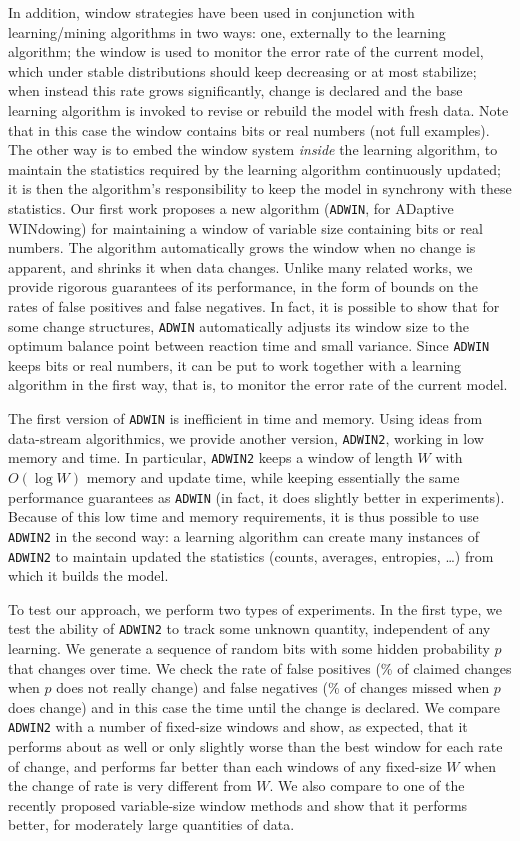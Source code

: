 In addition, window strategies have been used in conjunction
with learning/mining algorithms in two ways: one,
externally to the learning algorithm; the window is used
to monitor the error rate of the current model, which under
stable distributions should keep decreasing or at most stabilize;
when instead this rate grows significantly, change is declared and
the base learning algorithm is invoked to revise or rebuild the
model with fresh data. Note that in this case the window
contains bits or real numbers (not full examples).
The other way is to embed the window system {\em inside} the learning
algorithm, to maintain the statistics required by the learning
algorithm continuously updated; it is then the algorithm's responsibility
to keep the model in synchrony with these statistics. 
\ENDOMIT
Our first work \cite{bif-gav}
proposes a new algorithm ({\tt ADWIN}, for ADaptive
WINdowing) %
for maintaining a window of variable size containing bits or real numbers.
The algorithm automatically grows the window when no change is apparent,
and shrinks it when data changes.
Unlike many related works, we provide rigorous guarantees of
its performance, in the form of bounds on the rates of false positives
and false negatives.
In fact, it is possible to show that for some change structures, {\tt ADWIN}
automatically adjusts its window size to the optimum balance point
between reaction time and small variance.
Since {\tt ADWIN} keeps bits or real numbers, it can be put to work
together with a learning algorithm in the first way, that is,
to monitor the error rate of the current model.

The first version of {\tt ADWIN} is inefficient in time and memory.
Using ideas from data-stream algorithmics,
we provide another version, {\tt ADWIN2}, working in low memory and
time. In particular, {\tt ADWIN2} keeps a window of length $W$ with
$O(\log W)$ memory and update time, while keeping essentially
the same performance guarantees as {\tt ADWIN} (in fact, it does
slightly better in experiments).
Because of this low time and memory requirements, it is thus possible
to use {\tt ADWIN2} in the second way: a learning algorithm
can create many instances of {\tt ADWIN2} to maintain updated
the statistics (counts, averages, entropies, \dots) from which it
builds the model. 


To test our approach, we perform two types of experiments.
In the first type, we test the ability of {\tt ADWIN2}
to track some unknown quantity, independent of any learning.
We generate a sequence of random bits with some hidden
probability $p$ that changes over time. We check the rate
of false positives (\% of claimed changes when $p$ does not
really change) and false negatives (\% of changes missed
when $p$ does change) and in this case the time until
the change is declared. We compare {\tt ADWIN2} with
a number of fixed-size windows and show, as expected,
that it performs about as well or only slightly worse than the best
window for each rate of change, and performs far better than
each windows of any fixed-size $W$ when the change of rate is
very different from $W$. We also compare
to one of the recently proposed variable-size window methods \cite{Gama}
and show that it performs better, for moderately large quantities of data.


